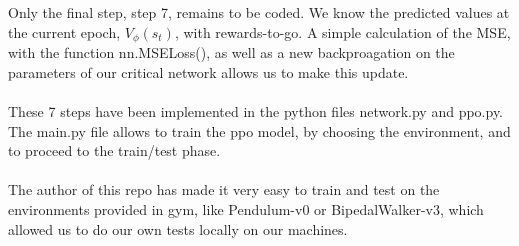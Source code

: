 \documentclass{article}
\begin{document}
\\ \\
Only the final step, step 7, remains to be coded. We know the predicted values at the current epoch, $V_\phi(s_t)$, with rewards-to-go. A simple calculation of the MSE, with the function nn.MSELoss(), as well as a new backproagation on the parameters of our critical network allows us to make this update. 
\\ \\
These 7 steps have been implemented in the python files network.py and ppo.py. The main.py file allows to train the ppo model, by choosing the environment, and to proceed to the train/test phase. 
\\ \\
The author of this repo has made it very easy to train and test on the environments provided in gym, like Pendulum-v0 or BipedalWalker-v3, which allowed us to do our own tests locally on our machines. 



\newpage
\end{document}
